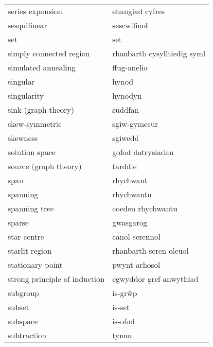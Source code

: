 \begin{supertabular}{p{0.22\textwidth}p{0.22\textwidth}}
                 series expansion &                  ehangiad cyfres \\
                     sesquilinear &                      sescwilinol \\
                              set &                              set \\
          simply connected region &      rhanbarth cysylltiedig syml \\
              simulated annealing &                      ffug-anelio \\
                         singular &                            hynod \\
                      singularity &                          hynodyn \\
              sink (graph theory) &                          suddfan \\
                   skew-symmetric &                     sgiw-gymesur \\
                         skewness &                          sgiwedd \\
                   solution space &                gofod datrysiadau \\
            source (graph theory) &                          tarddle \\
                             span &                        rhychwant \\
                         spanning &                       rhychwantu \\
                    spanning tree &                coeden rhychwantu \\
                           sparse &                        gwasgarog \\
                      star centre &                   canol serennol \\
                   starlit region &           rhanbarth seren oleuol \\
                 stationary point &                    pwynt arhosol \\
    strong principle of induction &          egwyddor gref anwythiad \\
                         subgroup &                          is-grŵp \\
                           subset &                           is-set \\
                         subspace &                          is-ofod \\
                      subtraction &                            tynnu \\

\end{supertabular}
